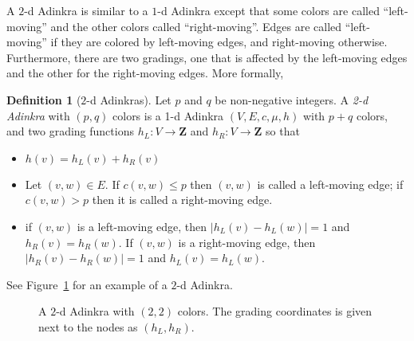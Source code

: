 \documentclass[12pt,twoside,singlespace]{article}
\numberwithin{equation}{section}
\theoremstyle{definition}
\newtheorem{definition}[equation]{Definition}
\newcommand{\ZZ}{\mathbf{Z}}
\begin{document}
A $2$-d Adinkra is similar to a $1$-d Adinkra except that some colors are called ``left-moving'' and the other colors called ``right-moving''.  Edges are called ``left-moving'' if they are colored by left-moving edges, and right-moving otherwise.  Furthermore, there are two gradings, one that is affected by the left-moving edges and the other for the right-moving edges. More formally,
\begin{definition}[$2$-d Adinkras]
Let $p$ and $q$ be non-negative integers. A \emph{2-d Adinkra} with $(p,q)$ colors is a 1-d Adinkra $(V,E,c,\mu,h)$ with $p+q$ colors, and two grading functions $h_L:V\to \ZZ$ and $h_R:V\to \ZZ$ so that
\begin{itemize}
\item $h(v)=h_L(v)+h_R(v)$
\item Let $(v,w)\in E$.  If $c(v,w)\le p$ then $(v,w)$ is called a left-moving edge; if $c(v,w)>p$ then it is called a right-moving edge.
\item if $(v,w)$ is a left-moving edge, then $|h_L(v)-h_L(w)|=1$ and $h_R(v)=h_R(w)$.  If $(v,w)$ is a right-moving edge, then $|h_R(v)-h_R(w)|=1$ and $h_L(v)=h_L(w)$.
\end{itemize}

See Figure~\ref{fig:2d-example} for an example of a $2$-d Adinkra.
\end{definition}

\begin{figure}[htb]
\begin{center}

\caption{A $2$-d Adinkra with $(2,2)$ colors. The grading coordinates is given next to the nodes as $(h_L, h_R)$. \label{fig:2d-example}}
\end{center}
\end{figure}
\end{document}
